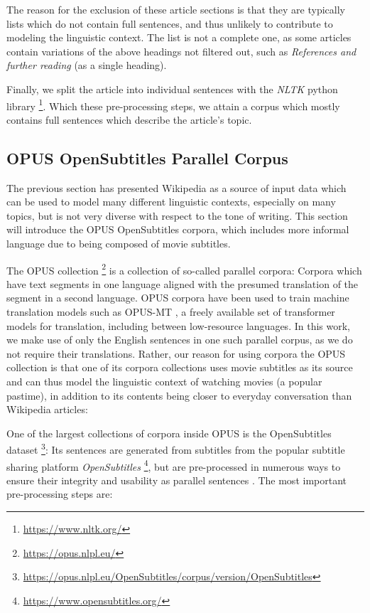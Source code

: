 The reason for the exclusion of these article sections is that they are typically lists which do not contain full sentences, and thus unlikely to contribute to modeling the linguistic context.
The list is not a complete one, as some articles contain variations of the above headings not filtered out, such as \textit{References and further reading} (as a single heading).

Finally, we split the article into individual sentences with the \textit{NLTK} python library \footnote{\url{https://www.nltk.org/}}.
Which these pre-processing steps, we attain a corpus which mostly contains full	sentences which describe the article's topic.

\subsection{OPUS OpenSubtitles Parallel Corpus} \label{sec:opensubtitles}
The previous section has presented Wikipedia as a source of input data which can be used to model many different linguistic contexts, especially on many topics, but is not very diverse with respect to the tone of writing.
This section will introduce the OPUS OpenSubtitles corpora, which includes more informal language due to being composed of movie subtitles.

The OPUS collection \footnote{\url{https://opus.nlpl.eu/}} is a collection of so-called parallel corpora:
Corpora which have text segments in one language aligned with the presumed translation of the segment in a second language.
OPUS corpora have been used to train machine translation models such as OPUS-MT \cite{tiedemannOPUSMTbuildingOpenTranslation2020}, a freely available set of transformer models for translation, including between low-resource languages.
In this work, we make use of only the English sentences in one such parallel corpus, as we do not require their translations.
Rather, our reason for using corpora the OPUS collection is that one of its corpora collections uses movie subtitles as its source and can thus model the linguistic context of watching movies (a popular pastime), in addition to its contents being closer to everyday conversation than Wikipedia articles:

One of the largest collections of corpora inside OPUS is the OpenSubtitles dataset \footnote{\url{https://opus.nlpl.eu/OpenSubtitles/corpus/version/OpenSubtitles}}:
Its sentences are generated from subtitles from the popular subtitle sharing platform \textit{OpenSubtitles} \footnote{\url{https://www.opensubtitles.org/} }, but are pre-processed in numerous ways to ensure their integrity and usability as parallel sentences \cite{lisonOpensubtitles2016ExtractingLarge2016}.
The most important pre-processing steps are:

